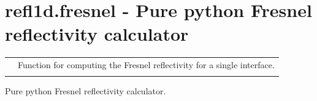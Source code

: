 \documentclass[letterpaper,10pt,english]{sphinxmanual}
\begin{document}
\section{refl1d.fresnel - Pure python Fresnel reflectivity calculator}
\label{api/fresnel:refl1d-fresnel-pure-python-fresnel-reflectivity-calculator}\label{api/fresnel::doc}
\begin{tabulary}{\linewidth}{LL}
\hline

{\hyperref[api/fresnel:refl1d.fresnel.Fresnel]{}}
 & 
Function for computing the Fresnel reflectivity for a single interface.
\\

{\hyperref[api/fresnel:refl1d.fresnel.test]{}}
 & 

\\
\hline
\end{tabulary}

\label{api/fresnel:module-refl1d.fresnel}
Pure python Fresnel reflectivity calculator.
\end{document}
